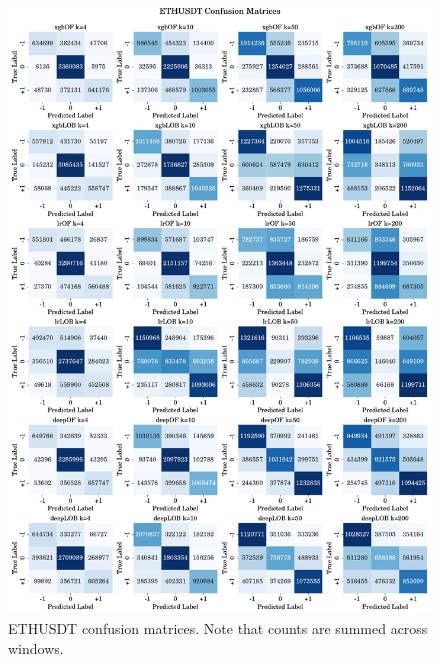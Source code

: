 \begin{figure}[htpb!]
    \centering
    \includegraphics[width=1.0\textwidth]{./images/ETHUSDT_confusion_matrices.pdf}
    \caption{ETHUSDT confusion matrices. Note that counts are summed across windows.}
    \label{ETHUSDT_cm}
\end{figure}

